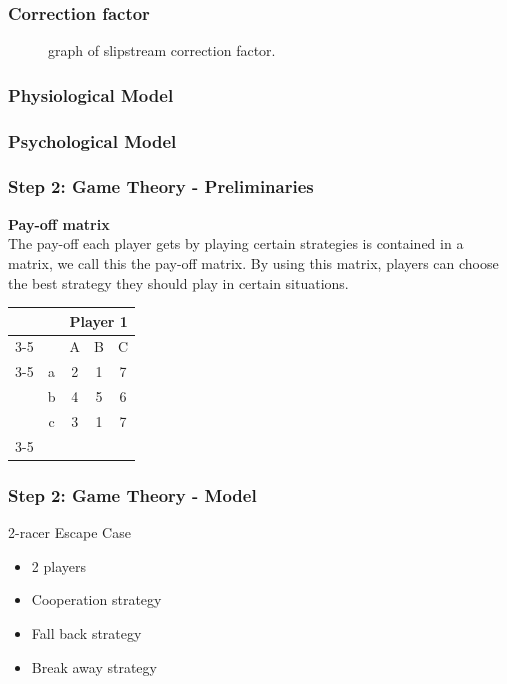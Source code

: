 \documentclass{beamer}
\begin{document}
\begin{frame}
\frametitle{Correction factor}
\begin{figure}[ht!]
  \centering
    \scalebox{0.6}{}
  \caption{graph of slipstream correction factor.}
\end{figure}
\end{frame}

\begin{frame}
\frametitle{Physiological Model}

\end{frame}

\begin{frame}
\frametitle{Psychological Model}

\end{frame}


\begin{frame}
\frametitle{Step 2: Game Theory - Preliminaries}

\textbf{Pay-off matrix}\\
The pay-off each player gets by playing certain strategies is contained in a matrix, we call this the pay-off matrix. By using this matrix, players can choose the best strategy they should play in certain situations.

\begin{example}
\begin{table}[ht!]
	\hspace{-4em}
	\centering
	\begin{tabular}{ccccc|}
		& & \multicolumn{3}{c}{Player 1}                                \\ \cline{3-5}
		& & A & B & \multicolumn{1}{c}{C}                               \\ \cline{3-5}
		\multirow{3}{*}{Player 2} & \multicolumn{1}{|c|}{a} & 2 & 1 & 7 \\
		& \multicolumn{1}{|c|}{b} & 4 & 5 & 6                           \\
		& \multicolumn{1}{|c|}{c} & 3 & 1 & 7                           \\ \cline{3-5}
	\end{tabular}
\end{table}
\end{example}

\end{frame}

\begin{frame}
\frametitle{Step 2: Game Theory - Model}
\begin{block}{2-racer Escape Case}
	\begin{itemize}
		\item 2 players
		\item Cooperation strategy
		\item Fall back strategy
		\item Break away strategy
	\end{itemize}
\end{block}
\end{frame}
\end{document}

